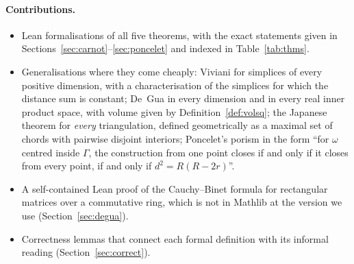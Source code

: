 \documentclass[11pt]{article}
\theoremstyle{definition}
\theoremstyle{remark}
\begin{document}
\paragraph{Contributions.}
\begin{itemize}
\item Lean formalisations of all five theorems, with the exact statements given in
Sections~\ref{sec:carnot}--\ref{sec:poncelet} and indexed in Table~\ref{tab:thms}.
\item Generalisations where they come cheaply: Viviani for simplices of every positive dimension, with a
characterisation of the simplices for which the distance sum is constant; De~Gua in every
dimension and in every real inner product space, with volume given by Definition~\ref{def:volsq}; the Japanese theorem for \emph{every}
triangulation, defined geometrically as a maximal set of chords with pairwise disjoint interiors;
Poncelet's porism in the form ``for $\omega$ centred inside $\Gamma$, the construction from one
point closes if and only if it closes from every point, if and only if $d^2=R(R-2r)$''.
\item A self-contained Lean proof of the Cauchy--Binet formula for rectangular matrices over a
commutative ring, which is not in Mathlib at the version we use (Section~\ref{sec:degua}).
\item Correctness lemmas that connect each formal definition with its informal reading
(Section~\ref{sec:correct}).
\end{itemize}
\end{document}
